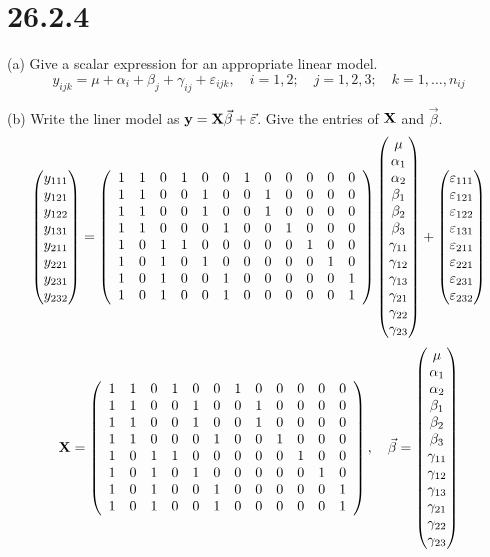 \section*{26.2.4}
(a) Give a scalar expression for an appropriate linear model.
$$y_{ijk}=\mu+\alpha_i+\beta_j+\gamma_{ij}+\varepsilon_{ijk},
\quad i=1,2;\quad j=1,2,3;\quad k=1,\ldots,n_{ij}$$

\bigskip
\noindent
(b) Write the liner model as ${\bf y}={\bf X}\vec\beta+\vec\varepsilon$.
Give the entries of $\bf X$ and $\vec\beta$.
$$\left(\begin{matrix}
y_{111}\cr
y_{121}\cr
y_{122}\cr
y_{131}\cr
y_{211}\cr
y_{221}\cr
y_{231}\cr
y_{232}
\end{matrix}\right)=\left(\begin{array}{cccccccccccc}
1 & 1 & 0 & 1 & 0 & 0 & 1 & 0 & 0 & 0 & 0 & 0\cr
1 & 1 & 0 & 0 & 1 & 0 & 0 & 1 & 0 & 0 & 0 & 0\cr
1 & 1 & 0 & 0 & 1 & 0 & 0 & 1 & 0 & 0 & 0 & 0\cr
1 & 1 & 0 & 0 & 0 & 1 & 0 & 0 & 1 & 0 & 0 & 0\cr
1 & 0 & 1 & 1 & 0 & 0 & 0 & 0 & 0 & 1 & 0 & 0\cr
1 & 0 & 1 & 0 & 1 & 0 & 0 & 0 & 0 & 0 & 1 & 0\cr
1 & 0 & 1 & 0 & 0 & 1 & 0 & 0 & 0 & 0 & 0 & 1\cr
1 & 0 & 1 & 0 & 0 & 1 & 0 & 0 & 0 & 0 & 0 & 1
\end{array}\right)\left(\begin{matrix}
\mu\cr
\alpha_1\cr
\alpha_2\cr
\beta_1\cr
\beta_2\cr
\beta_3\cr
\gamma_{11}\cr
\gamma_{12}\cr
\gamma_{13}\cr
\gamma_{21}\cr
\gamma_{22}\cr
\gamma_{23}
\end{matrix}\right)+\left(\begin{matrix}
\varepsilon_{111}\cr
\varepsilon_{121}\cr
\varepsilon_{122}\cr
\varepsilon_{131}\cr
\varepsilon_{211}\cr
\varepsilon_{221}\cr
\varepsilon_{231}\cr
\varepsilon_{232}
\end{matrix}\right)
$$
$$
{\bf X}=
\left(\begin{array}{cccccccccccc}
1 & 1 & 0 & 1 & 0 & 0 & 1 & 0 & 0 & 0 & 0 & 0\cr
1 & 1 & 0 & 0 & 1 & 0 & 0 & 1 & 0 & 0 & 0 & 0\cr
1 & 1 & 0 & 0 & 1 & 0 & 0 & 1 & 0 & 0 & 0 & 0\cr
1 & 1 & 0 & 0 & 0 & 1 & 0 & 0 & 1 & 0 & 0 & 0\cr
1 & 0 & 1 & 1 & 0 & 0 & 0 & 0 & 0 & 1 & 0 & 0\cr
1 & 0 & 1 & 0 & 1 & 0 & 0 & 0 & 0 & 0 & 1 & 0\cr
1 & 0 & 1 & 0 & 0 & 1 & 0 & 0 & 0 & 0 & 0 & 1\cr
1 & 0 & 1 & 0 & 0 & 1 & 0 & 0 & 0 & 0 & 0 & 1
\end{array}\right),\quad
\vec\beta=\left(\begin{matrix}
\mu\cr
\alpha_1\cr
\alpha_2\cr
\beta_1\cr
\beta_2\cr
\beta_3\cr
\gamma_{11}\cr
\gamma_{12}\cr
\gamma_{13}\cr
\gamma_{21}\cr
\gamma_{22}\cr
\gamma_{23}
\end{matrix}\right)
$$
